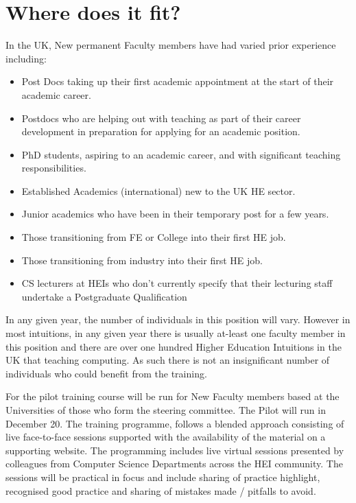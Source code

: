 \documentclass[sigconf]{acmart}
\begin{document}
\section{Where does it fit?}
In the UK, New permanent Faculty members have had varied prior experience including:
\begin{itemize}
\item Post Docs taking up their first academic appointment at the start of their academic career.
\item Postdocs who are helping out with teaching as part of their career development in preparation for applying for an academic position.
\item PhD students, aspiring to an academic career, and with significant teaching responsibilities.
\item Established Academics (international) new to the UK HE sector.
\item Junior academics who have been in their temporary post for a few years.
\item Those transitioning from FE or College into their first HE job.
\item Those transitioning from industry into their first HE job.
\item CS lecturers at HEIs who don’t currently specify that their lecturing staff undertake  a Postgraduate Qualification
\end{itemize}

In any given year, the number of individuals in this position will vary. However in most intuitions, in any given year there is usually at-least one faculty member in this position and there are over one hundred Higher Education Intuitions in the UK that teaching computing. As such there is not an insignificant number of individuals who could benefit from the training.

For the pilot training course will be run for New Faculty members based at the Universities of those who form the steering committee. The Pilot will run in December 20. The training programme, follows a blended approach consisting of live face-to-face sessions supported with the availability of the material on a supporting website. The programming includes live virtual sessions presented by colleagues from Computer Science Departments across the HEI community. The sessions will be practical in focus and include sharing of practice highlight, recognised good practice and sharing of mistakes made / pitfalls to avoid.
\end{document}
